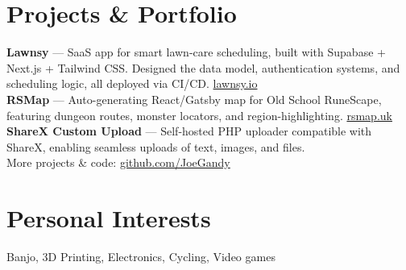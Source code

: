 \documentclass[11pt,a4paper]{article}
\begin{document}
\section*{Projects \& Portfolio}
\textbf{Lawnsy} --- SaaS app for smart lawn-care scheduling, built with Supabase + Next.js + Tailwind CSS. Designed the data model, authentication systems, and scheduling logic, all deployed via CI/CD. \href{https://lawnsy.io}{lawnsy.io} \\[0.4em]
\textbf{RSMap} --- Auto-generating React/Gatsby map for Old School RuneScape, featuring dungeon routes, monster locators, and region-highlighting. \href{https://rsmap.uk}{rsmap.uk} \\[0.4em]
\textbf{ShareX Custom Upload} --- Self-hosted PHP uploader compatible with ShareX, enabling seamless uploads of text, images, and files. \\[0.4em]
More projects \& code: \href{https://github.com/JoeGandy}{github.com/JoeGandy}

\section*{Personal Interests}
Banjo, 3D Printing, Electronics, Cycling, Video games
\end{document}
